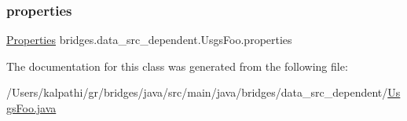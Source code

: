 \mbox{\label{classbridges_1_1data__src__dependent_1_1_usgs_foo_a030d83e136f146824b5bda34a4c6fd1c}} 
\subsubsection{\texorpdfstring{properties}{properties}}
{\footnotesize\ttfamily \mbox{\hyperlink{classbridges_1_1data__src__dependent_1_1_usgs_foo_1_1_properties}{Properties}} bridges.\+data\+\_\+src\+\_\+dependent.\+Usgs\+Foo.\+properties}



The documentation for this class was generated from the following file\+:\begin{DoxyCompactItemize}
\item 
/\+Users/kalpathi/gr/bridges/java/src/main/java/bridges/data\+\_\+src\+\_\+dependent/\mbox{\hyperlink{_usgs_foo_8java}{Usgs\+Foo.\+java}}\end{DoxyCompactItemize}
